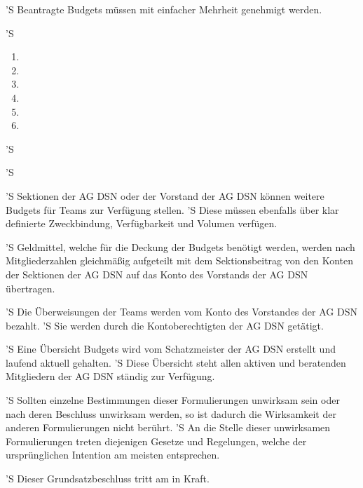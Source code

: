 \documentclass[draft,parskip=half-,DIV=12,mpinclude]{scrartcl}
\begin{document}
\begin{contract}
'S Beantragte Budgets müssen mit einfacher Mehrheit genehmigt werden.

'S 
\begin{enumerate}
  \item {}
  \item {}
  \item {}
  \item {}
  \item {}
  \item {}
\end{enumerate}


'S 

'S 

'S Sektionen der AG DSN oder der Vorstand der AG DSN können weitere Budgets für Teams zur Verfügung stellen.
'S Diese müssen ebenfalls über klar definierte Zweckbindung, Verfügbarkeit und Volumen verfügen.

'S Geldmittel, welche für die Deckung der Budgets benötigt werden, werden nach Mitgliederzahlen gleichmäßig aufgeteilt mit dem Sektionsbeitrag von den Konten der Sektionen der AG DSN auf das Konto des Vorstands der AG DSN übertragen.

'S Die Überweisungen der Teams werden vom Konto des Vorstandes der AG DSN bezahlt.
'S Sie werden durch die Kontoberechtigten der AG DSN getätigt.

'S Eine Übersicht  Budgets wird vom Schatzmeister der AG DSN erstellt und laufend aktuell gehalten.
'S Diese Übersicht steht allen aktiven und beratenden Mitgliedern der AG DSN ständig zur Verfügung.

'S Sollten einzelne Bestimmungen dieser Formulierungen unwirksam sein oder nach deren Beschluss unwirksam werden, so ist dadurch die Wirksamkeit der anderen Formulierungen nicht berührt.
'S An die Stelle dieser unwirksamen Formulierungen treten diejenigen Gesetze und Regelungen, welche der ursprünglichen Intention am meisten entsprechen.

'S Dieser Grundsatzbeschluss tritt am  in Kraft.

\end{contract}
\end{document}
